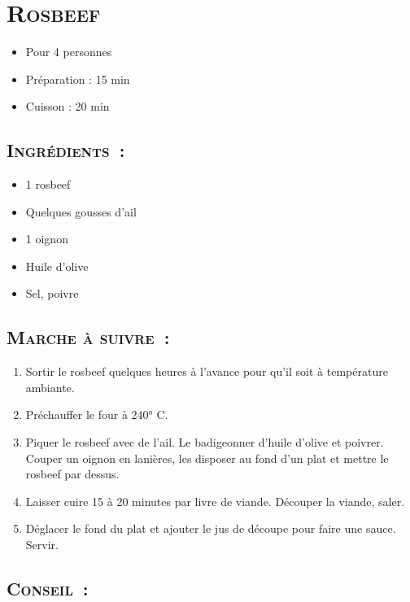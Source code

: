 \section[\normalsize{Rosbeef}]{\LARGE{\textsc{Rosbeef}}}		%


\begin{itemize}
\item Pour 4 personnes
\item Préparation : 15 min
\item Cuisson : 20 min
\end{itemize}

\subsection*{\textsc{Ingr\'edients~:}}

\begin{itemize}
\item 1 rosbeef
\item Quelques gousses d'ail
\item 1 oignon
\item Huile d'olive
\item Sel, poivre 
\end{itemize}


\subsection*{\textsc{Marche \`a suivre~:}}

\begin{enumerate}
\item Sortir le rosbeef quelques heures \`a l'avance pour qu'il soit \`a temp\'erature ambiante.
\item Pr\'echauffer le four \`a 240° C.
\item Piquer le rosbeef avec de l'ail. Le badigeonner d'huile d'olive et poivrer. Couper un oignon en lani\`eres, les disposer au fond d'un plat et mettre le rosbeef par dessus.
\item Laisser cuire 15 \`a 20 minutes par livre de viande. D\'ecouper la viande, saler. 
\item D\'eglacer le fond du plat et ajouter le jus de d\'ecoupe pour faire une sauce. Servir.
\end{enumerate}
\subsection*{\textsc{Conseil~:}}
